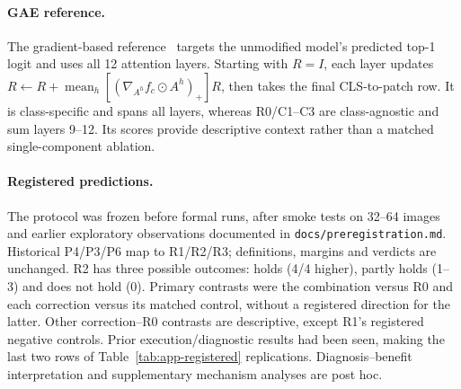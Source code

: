 \paragraph{GAE reference.} The gradient-based reference~\citep{chefer2021generic} targets the unmodified model's predicted top-1 logit and uses all 12 attention layers. Starting with $R=I$, each layer updates $R\leftarrow R+\operatorname{mean}_h[(\nabla_{A^h}f_c\odot A^h)_+]R$, then takes the final CLS-to-patch row. It is class-specific and spans all layers, whereas R0/C1--C3 are class-agnostic and sum layers 9--12. Its scores provide descriptive context rather than a matched single-component ablation.

\paragraph{Registered predictions.} The protocol was frozen before formal runs, after smoke tests on 32--64 images and earlier exploratory observations documented in \texttt{docs/preregistration.md}. Historical P4/P3/P6 map to R1/R2/R3; definitions, margins and verdicts are unchanged. R2 has three possible outcomes: holds (4/4 higher), partly holds (1--3) and does not hold (0). Primary contrasts were the combination versus R0 and each correction versus its matched control, without a registered direction for the latter. Other correction--R0 contrasts are descriptive, except R1's registered negative controls. Prior execution/diagnostic results had been seen, making the last two rows of Table~\ref{tab:app-registered} replications. Diagnosis--benefit interpretation and supplementary mechanism analyses are post hoc.

